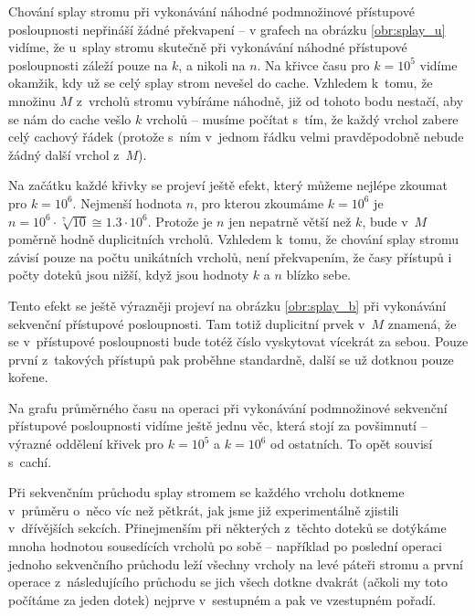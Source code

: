 Chování splay stromu při vykonávání náhodné podmnožinové přístupové
posloupnosti nepřináší žádné překvapení -- v grafech na obrázku \ref{obr:splay_u}
vidíme, že u~splay stromu skutečně při vykonávání náhodné přístupové
posloupnosti záleží pouze na $k$, a nikoli na $n$. Na křivce času pro $k =
 10^5$ vidíme okamžik, kdy už se celý splay strom nevešel do cache.
Vzhledem k~tomu, že množinu $M$ z~vrcholů stromu vybíráme náhodně, již od
tohoto bodu nestačí, aby se nám do cache vešlo $k$ vrcholů -- musíme počítat
s~tím, že každý vrchol zabere celý cachový řádek (protože s~ním v~jednom řádku
velmi pravděpodobně nebude žádný další vrchol z~$M$).

Na začátku každé křivky se projeví ještě efekt, který můžeme nejlépe zkoumat
pro $k =  10^6$. Nejmenší hodnota $n$, pro kterou zkoumáme $k=
10^6$ je $n=  10^6\cdot \sqrt[7]{10} \cong 1.3\cdot10^6$. Protože je $n$
jen nepatrně větší než $k$, bude v~$M$ poměrně hodně duplicitních vrcholů.
Vzhledem k~tomu, že chování splay stromu závisí pouze na počtu unikátních
vrcholů, není překvapením, že časy přístupů i počty doteků jsou nižší, když jsou hodnoty $k$ a $n$ blízko sebe.

Tento efekt se ještě výrazněji projeví na obrázku \ref{obr:splay_b} při vykonávání sekvenční přístupové posloupnosti. Tam totiž duplicitní prvek v~$M$ znamená, že se v~přístupové posloupnosti bude totéž číslo vyskytovat vícekrát za sebou. Pouze první z~takových přístupů pak proběhne standardně, další se už dotknou pouze kořene.

Na grafu průměrného času na operaci při vykonávání podmnožinové sekvenční
přístupové posloupnosti vidíme ještě jednu věc, která stojí za povšimnutí --
výrazné oddělení křivek pro $k= 10^5$ a $k= 10^6$ od ostatních. To opět souvisí s~cachí. 

Při sekvenčním průchodu splay stromem se každého vrcholu dotkneme v~průměru o~něco víc než pětkrát, jak jsme již experimentálně zjistili v~dřívějších sekcích. Přinejmenším při některých z~těchto doteků se dotýkáme mnoha hodnotou sousedících vrcholů po sobě -- například po poslední operaci jednoho sekvenčního průchodu leží všechny vrcholy na levé páteři stromu a první operace z~následujícího průchodu se jich všech dotkne dvakrát (ačkoli my toto počítáme za jeden dotek) nejprve v~sestupném a pak ve vzestupném pořadí. 


